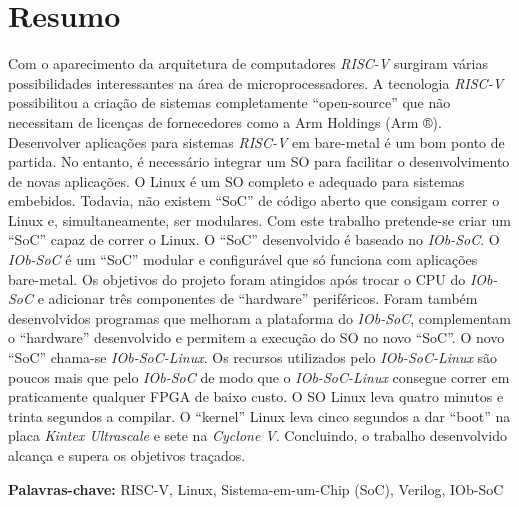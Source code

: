 \cleardoubleoddpage

\chapter*{Resumo}
\thispagestyle{empty} %

Com o aparecimento da arquitetura de computadores \textit{RISC-V} surgiram várias possibilidades interessantes na área de microprocessadores. A tecnologia \textit{RISC-V} possibilitou a criação de sistemas completamente “open-source” que não necessitam de licenças de fornecedores como a Arm Holdings (Arm ®). Desenvolver aplicações para sistemas \textit{RISC-V} em bare-metal é um bom ponto de partida. No entanto, é necessário integrar um SO para facilitar o desenvolvimento de novas aplicações. O Linux é um SO completo e adequado para sistemas embebidos. Todavia, não existem “SoC” de código aberto que consigam correr o Linux e, simultaneamente, ser modulares.
%  
Com este trabalho pretende-se criar um “SoC” capaz de correr o Linux. O “SoC” desenvolvido é baseado no \textit{IOb-SoC}. O \textit{IOb-SoC} é um “SoC” modular e configurável que só funciona com aplicações bare-metal. Os objetivos do projeto foram atingidos após trocar o CPU do \textit{IOb-SoC} e adicionar três componentes de “hardware” periféricos. Foram também desenvolvidos programas que melhoram a plataforma do \textit{IOb-SoC}, complementam o “hardware” desenvolvido e permitem a execução do SO no novo “SoC”. O novo “SoC” chama-se \textit{IOb-SoC-Linux}.  
%  
Os recursos utilizados pelo \textit{IOb-SoC-Linux} são poucos mais que pelo \textit{IOb-SoC} de modo que o \textit{IOb-SoC-Linux} consegue correr em praticamente qualquer FPGA de baixo custo. O SO Linux leva quatro minutos e trinta segundos a compilar. O “kernel” Linux leva cinco segundos a dar “boot” na placa \textit{Kintex Ultrascale} e sete na \textit{Cyclone V}. Concluindo, o trabalho desenvolvido alcança e supera os objetivos traçados.

\vfill

\textbf{\Large Palavras-chave:} RISC-V, Linux, Sistema-em-um-Chip (SoC), Verilog, IOb-SoC

